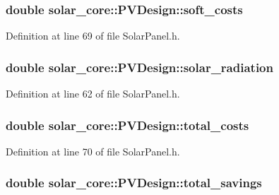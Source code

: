 \subsubsection[{soft\+\_\+costs}]{\setlength{\rightskip}{0pt plus 5cm}double solar\+\_\+core\+::\+P\+V\+Design\+::soft\+\_\+costs}\label{classsolar__core_1_1_p_v_design_ac1220011d65d7cc442cd143f93123f31}


Definition at line 69 of file Solar\+Panel.\+h.

\hypertarget{classsolar__core_1_1_p_v_design_a1a20c72743528802ed5498fe848559df}{}
\subsubsection[{solar\+\_\+radiation}]{\setlength{\rightskip}{0pt plus 5cm}double solar\+\_\+core\+::\+P\+V\+Design\+::solar\+\_\+radiation}\label{classsolar__core_1_1_p_v_design_a1a20c72743528802ed5498fe848559df}


Definition at line 62 of file Solar\+Panel.\+h.

\hypertarget{classsolar__core_1_1_p_v_design_ac015f1cf090279e45861f2860f008cc2}{}
\subsubsection[{total\+\_\+costs}]{\setlength{\rightskip}{0pt plus 5cm}double solar\+\_\+core\+::\+P\+V\+Design\+::total\+\_\+costs}\label{classsolar__core_1_1_p_v_design_ac015f1cf090279e45861f2860f008cc2}


Definition at line 70 of file Solar\+Panel.\+h.

\hypertarget{classsolar__core_1_1_p_v_design_a7628fe2e1ea95f8df79aca11dd5a356d}{}
\subsubsection[{total\+\_\+savings}]{\setlength{\rightskip}{0pt plus 5cm}double solar\+\_\+core\+::\+P\+V\+Design\+::total\+\_\+savings}\label{classsolar__core_1_1_p_v_design_a7628fe2e1ea95f8df79aca11dd5a356d}


